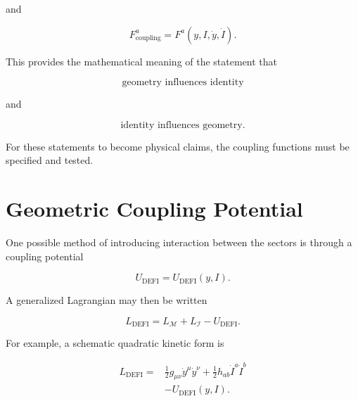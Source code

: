 \documentclass[12pt,oneside]{book}
\newcommand{\DEFI}{\mathrm{DEFI}}
\begin{document}
and

\begin{equation}
    F^a_{\mathrm{coupling}}
    =
    F^a
    \left(
        y,
        I,
        \dot{y},
        \dot{I}
    \right).
\end{equation}

This provides the mathematical meaning of the statement that

\begin{equation}
    \text{geometry influences identity}
\end{equation}

and

\begin{equation}
    \text{identity influences geometry}.
\end{equation}

For these statements to become physical claims, the coupling
functions must be specified and tested.


\section{Geometric Coupling Potential}
\label{sec:geometric-coupling-potential}

One possible method of introducing interaction between the
sectors is through a coupling potential

\begin{equation}
    U_{\DEFI}
    =
    U_{\DEFI}(y,I).
    \label{eq:defi-coupling-potential}
\end{equation}

A generalized Lagrangian may then be written

\begin{equation}
    L_{\DEFI}
    =
    L_{\mathcal{M}}
    +
    L_{\mathcal{I}}
    -
    U_{\DEFI}.
    \label{eq:defi-preliminary-lagrangian}
\end{equation}

For example, a schematic quadratic kinetic form is

\begin{equation}
\begin{aligned}
    L_{\DEFI}
    ={}&
    \frac{1}{2}
    g_{\mu\nu}
    \dot{y}^{\mu}
    \dot{y}^{\nu}
    +
    \frac{1}{2}
    h_{ab}
    \dot{I}^{a}
    \dot{I}^{b}
    \\
    &-
    U_{\DEFI}(y,I).
\end{aligned}
\label{eq:defi-quadratic-lagrangian}
\end{equation}
\end{document}
